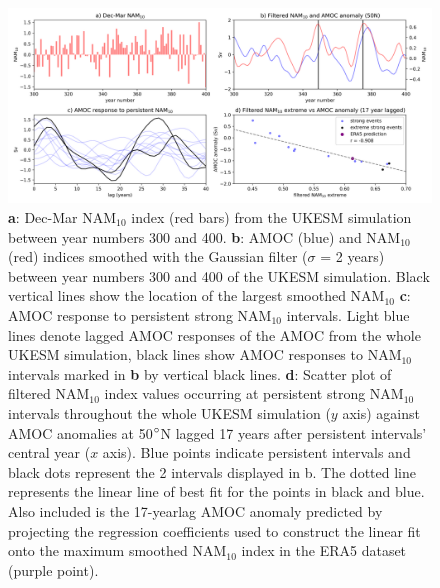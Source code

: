 \begin{figure}[h!]
\begin{center}
\noindent\includegraphics[width =\linewidth]{Figures/Figures-surface/AMOC_response_special_events.png} 
\caption[Regression of NAM$_{10}$ extreme magnitude vs AMOC anomaly at 50$\degree$N]{\textbf{a}: Dec-Mar NAM$_{10}$ index (red bars) from the UKESM simulation between year numbers 300 and 400. \textbf{b}: AMOC (blue) and NAM$_{10}$ (red) indices smoothed with the Gaussian filter ($\sigma$ = 2 years) between year numbers 300 and 400 of the UKESM simulation. Black vertical lines show the location of the largest smoothed NAM$_{10}$  \textbf{c}: AMOC response to persistent strong NAM$_{10}$ intervals. Light blue lines denote lagged AMOC responses of the AMOC from the whole UKESM simulation, black lines show AMOC responses to NAM$_{10}$ intervals marked in \textbf{b} by vertical black lines. \textbf{d}: Scatter plot of filtered NAM$_{10}$ index values occurring at persistent strong NAM$_{10}$ intervals throughout the whole UKESM simulation ($y$ axis) against AMOC anomalies at 50$\degree$N lagged 17 years after persistent intervals' central year ($x$ axis). Blue points indicate persistent intervals and black dots represent the 2 intervals displayed in b. The dotted line represents the linear line of best fit for the points in black and blue. Also included is the 17-yearlag AMOC anomaly predicted by projecting the regression coefficients used to construct the linear fit onto the maximum smoothed NAM$_{10}$ index in the ERA5 dataset (purple point).}
\label{special_events}
\end{center}
\end{figure}

